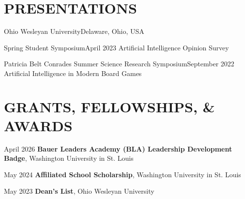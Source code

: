 \documentclass[10pt, letterpaper]{article}
\begin{document}
\vspace{\headerSpacing}

\section{PRESENTATIONS}

\begin{leadershipentry}{Ohio Wesleyan University}{Delaware, Ohio, USA}
	\begin{presentationentry}{Spring Student Symposium}{April 2023}
		Artificial Intelligence Opinion Survey
	\end{presentationentry}
	\begin{presentationentry}{Patricia Belt Conrades Summer Science Research Symposium}{September 2022}
		Artificial Intelligence in Modern Board Games
	\end{presentationentry}
\end{leadershipentry}

\vspace{\headerSpacing}

\section{GRANTS, FELLOWSHIPS, \& AWARDS}

\begin{honorentry}
	{April 2026} %
	{\textbf{Bauer Leaders Academy (BLA) Leadership Development Badge}, Washington University in St. Louis} %
\end{honorentry}

\begin{honorentry}
	{May 2024} %
	{\textbf{Affiliated School Scholarship}, Washington University in St. Louis} %
\end{honorentry}

\begin{honorentry}
	{May 2023} %
	{\textbf{Dean's List}, Ohio Wesleyan University} %
\end{honorentry}
\end{document}
